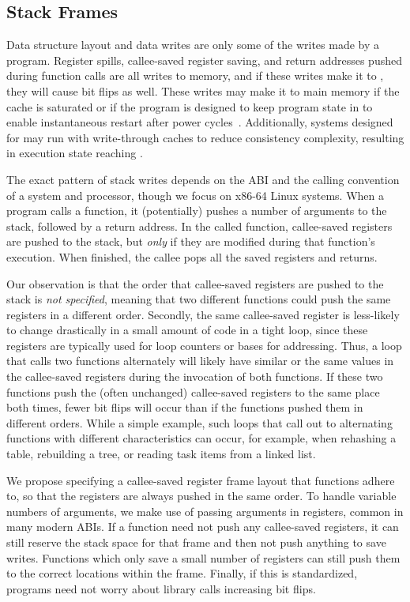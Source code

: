 \subsection{Stack Frames}
\label{sec:stack}

Data structure layout and data writes are only some of the writes made by a
program. Register spills, callee-saved register saving,
and return addresses pushed during function calls are all writes to memory, and
if these writes make it to \NVM, they will cause bit flips as well. These writes
may make it to main memory if the cache is saturated or if the program is
designed to keep program state in \NVM to enable instantaneous restart after
power cycles~\cite{narayanan:asplos12}. Additionally, systems designed for \NVM may run with write-through
caches to reduce consistency complexity, resulting in execution state reaching
\NVM.

The exact pattern of stack writes depends on the ABI and the calling convention of a system and
processor, though we focus on x86-64 Linux systems. When a program calls a function, it
(potentially) pushes a number of arguments to the stack, followed by a return address.  In the
called function, callee-saved registers are pushed to the stack, but \emph{only} if they are modified
during that function's execution. When finished, the callee pops all the saved registers and
returns.

Our observation is that the order that callee-saved registers are pushed to the
stack is \textit{not specified}, meaning that two different functions could push
the same registers in a different order. Secondly, the same callee-saved register
is less-likely to change drastically in a small amount of code in a tight loop,
since these registers are typically used for loop counters or bases for
addressing. Thus, a loop that calls two functions alternately will likely have
similar or the same values in the callee-saved registers during the invocation
of both functions.
If these two functions push the (often unchanged)
callee-saved registers to the same place both times, fewer bit
flips will occur than if the functions pushed them in different orders.
While a simple example,
such loops that call out to alternating functions with different characteristics can occur, for
example, when rehashing a table, rebuilding a tree, or reading task items from a linked
list.

We propose specifying a callee-saved register frame layout that functions adhere
to, so that the registers are always pushed in the same order. To handle
variable numbers of arguments, we make use of passing arguments in registers,
common in many modern ABIs. If a function
need not push any callee-saved registers, it can still reserve the stack space
for that frame and then not push anything to save writes. Functions which only
save a small number of registers can still push them to the correct locations
within the frame. Finally, if this is standardized, programs need not worry
about library calls increasing bit flips.


